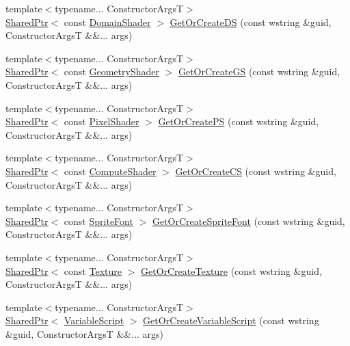 \begin{DoxyCompactItemize}
\item 
{\footnotesize template$<$typename... Constructor\+ArgsT$>$ }\\\hyperlink{namespacemage_a1e01ae66713838a7a67d30e44c67703e}{Shared\+Ptr}$<$ const \hyperlink{namespacemage_aef8cda73e2387cb89baa6c54a7fea542}{Domain\+Shader} $>$ \hyperlink{classmage_1_1_resource_manager_a77fd5f64a5191df468ccfaabd197d60b}{Get\+Or\+Create\+DS} (const wstring \&guid, Constructor\+ArgsT \&\&... args)
\item 
{\footnotesize template$<$typename... Constructor\+ArgsT$>$ }\\\hyperlink{namespacemage_a1e01ae66713838a7a67d30e44c67703e}{Shared\+Ptr}$<$ const \hyperlink{namespacemage_a0cf0bb4b74903e78658c96412d5687a6}{Geometry\+Shader} $>$ \hyperlink{classmage_1_1_resource_manager_a2d0c96862f5658379bc1bce9b77d9003}{Get\+Or\+Create\+GS} (const wstring \&guid, Constructor\+ArgsT \&\&... args)
\item 
{\footnotesize template$<$typename... Constructor\+ArgsT$>$ }\\\hyperlink{namespacemage_a1e01ae66713838a7a67d30e44c67703e}{Shared\+Ptr}$<$ const \hyperlink{namespacemage_a27ecaf266420ee7a494d64edc0757129}{Pixel\+Shader} $>$ \hyperlink{classmage_1_1_resource_manager_a567c4e158de9a664d76c464c12aed7d2}{Get\+Or\+Create\+PS} (const wstring \&guid, Constructor\+ArgsT \&\&... args)
\item 
{\footnotesize template$<$typename... Constructor\+ArgsT$>$ }\\\hyperlink{namespacemage_a1e01ae66713838a7a67d30e44c67703e}{Shared\+Ptr}$<$ const \hyperlink{namespacemage_ae040329401484b076f0cd1a7c43d19c9}{Compute\+Shader} $>$ \hyperlink{classmage_1_1_resource_manager_aa23f61f37b9d2fcc3f53d8018a32a22c}{Get\+Or\+Create\+CS} (const wstring \&guid, Constructor\+ArgsT \&\&... args)
\item 
{\footnotesize template$<$typename... Constructor\+ArgsT$>$ }\\\hyperlink{namespacemage_a1e01ae66713838a7a67d30e44c67703e}{Shared\+Ptr}$<$ const \hyperlink{classmage_1_1_sprite_font}{Sprite\+Font} $>$ \hyperlink{classmage_1_1_resource_manager_afbbe2d21f2628c1e6d8518fd076375be}{Get\+Or\+Create\+Sprite\+Font} (const wstring \&guid, Constructor\+ArgsT \&\&... args)
\item 
{\footnotesize template$<$typename... Constructor\+ArgsT$>$ }\\\hyperlink{namespacemage_a1e01ae66713838a7a67d30e44c67703e}{Shared\+Ptr}$<$ const \hyperlink{classmage_1_1_texture}{Texture} $>$ \hyperlink{classmage_1_1_resource_manager_a752a3c3db2cf7d93c61c5f22e0bf6a3a}{Get\+Or\+Create\+Texture} (const wstring \&guid, Constructor\+ArgsT \&\&... args)
\item 
{\footnotesize template$<$typename... Constructor\+ArgsT$>$ }\\\hyperlink{namespacemage_a1e01ae66713838a7a67d30e44c67703e}{Shared\+Ptr}$<$ \hyperlink{classmage_1_1_variable_script}{Variable\+Script} $>$ \hyperlink{classmage_1_1_resource_manager_aa3d2659c473c06423447114dcc0a602c}{Get\+Or\+Create\+Variable\+Script} (const wstring \&guid, Constructor\+ArgsT \&\&... args)
\end{DoxyCompactItemize}
